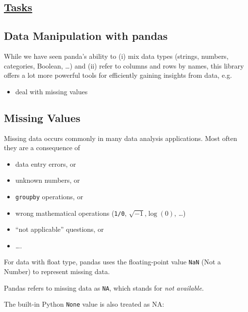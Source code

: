 \documentclass[
  letterpaper,
  DIV=11,
  numbers=noendperiod]{scrreprt}
\providecommand{\tightlist}{%
  \setlength{\itemsep}{0pt}\setlength{\parskip}{0pt}}\usepackage{longtable,booktabs,array}
\begin{document}
\hypertarget{tasks-2}{%
\subsection{\texorpdfstring{\href{Lecture6_exercises.ipynb}{Tasks}}{Tasks}}\label{tasks-2}}

\hypertarget{data-manipulation-with-pandas}{%
\subsection{Data Manipulation with
pandas}\label{data-manipulation-with-pandas}}

While we have seen panda's ability to (i) mix data types (strings,
numbers, categories, Boolean, \ldots) and (ii) refer to columns and rows
by names, this library offers a lot more powerful tools for efficiently
gaining insights from data, e.g.

\begin{itemize}
\tightlist
\item
  deal with missing values
\end{itemize}

\hypertarget{missing-values}{%
\subsection{Missing Values}\label{missing-values}}

Missing data occurs commonly in many data analysis applications. Most
often they are a consequence of

\begin{itemize}
\tightlist
\item
  data entry errors, or
\item
  unknown numbers, or
\item
  \texttt{groupby} operations, or
\item
  wrong mathematical operations (\texttt{1/0},
  \(\sqrt{-1}\),\(\log(0)\), \ldots)
\item
  ``not applicable'' questions, or
\item
  \ldots.
\end{itemize}

For data with float type, pandas uses the floating-point value
\texttt{NaN} (Not a Number) to represent missing data.

Pandas refers to missing data as \texttt{NA}, which stands for \emph{not
available}.

The built-in Python \texttt{None} value is also treated as NA:
\end{document}
